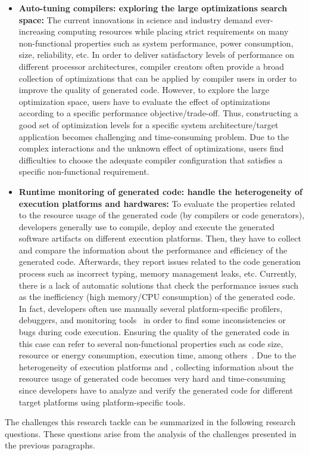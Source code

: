 \begin{itemize}
\item
\textbf{Auto-tuning compilers: exploring the large optimizations search space:} The current innovations in science and industry demand ever-increasing computing resources while placing strict requirements on many non-functional properties such as system performance, power consumption, size, reliability, etc. In order to deliver satisfactory levels of performance on different processor architectures, compiler creators often provide a broad collection of optimizations that can be applied by compiler users in order to improve the quality of generated code. However, to explore the large optimization space, users have to evaluate the effect of optimizations according to a specific performance objective/trade-off. Thus, constructing a good set of optimization levels for a specific system architecture/target application becomes challenging and time-consuming problem. Due to the complex interactions and the unknown effect of optimizations, users find difficulties to choose the adequate compiler configuration that satisfies a specific non-functional requirement.

\item
\textbf{Runtime monitoring of generated code: handle the heterogeneity of execution platforms and hardwares:} To evaluate the properties related to the resource usage of the generated code (by compilers or code generators), developers generally use to compile, deploy and execute the generated software artifacts on different execution platforms. Then, they have to collect and compare the information about the performance and efficiency of the generated code. Afterwards, they report issues related to the code generation process such as incorrect typing, memory management leaks, etc.
	Currently, there is a lack of automatic solutions that check the performance issues such as the inefficiency (high memory/CPU consumption) of the generated code. In fact, developers often use manually several platform-specific profilers, debuggers, and monitoring tools~\cite{guana2014chaintracker,delgado2004taxonomy} in order to find some inconsistencies or bugs during code execution. Ensuring the quality of the generated code in this case can refer to several non-functional properties such as code size, resource or energy consumption, execution time, among others~\cite{pan2006fast}. Due to the heterogeneity of execution platforms and , collecting information about the resource usage of generated code becomes very hard and time-consuming  since developers have to analyze and verify the generated code for different target platforms using platform-specific tools. 


\end{itemize}
The challenges this research tackle can be summarized in the following research questions. These questions arise from the analysis of the challenges presented in the previous paragraphs.

